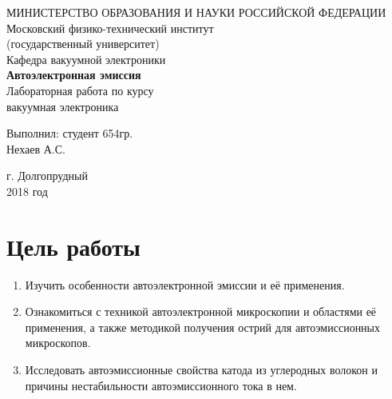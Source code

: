 \documentclass[a4paper, 12pt]{article}
\begin{document}
	\begin{titlepage}
		\begin{center}
		МИНИСТЕРСТВО ОБРАЗОВАНИЯ И НАУКИ РОССИЙСКОЙ ФЕДЕРАЦИИ\\
		\footnotesize{Московский физико-технический институт}\\
		\footnotesize{(государственный университет)}\\
		\footnotesize{Кафедра вакуумной электроники}\\
		\vfill
		{\LARGE
		\textbf{Автоэлектронная эмиссия}\\
		}
		\vspace{1cm}
		Лабораторная работа по курсу\\
		вакуумная электроника
		\vfill
		\begin{flushright}
			Выполнил: студент 654гр.\\
			Нехаев А.С.
		\end{flushright}
		\vfill
		г. Долгопрудный\\
		2018 год
		\end{center}
	\end{titlepage}
	\newpage
	\tableofcontents
	\newpage
	\section{Цель работы}
	\begin{enumerate}
		\item Изучить особенности автоэлектронной эмиссии и её применения.
		\item Ознакомиться с техникой автоэлектронной микроскопии и областями её применения, а также методикой получения острий для автоэмиссионных микроскопов.
		\item Исследовать автоэмиссионные свойства катода из углеродных волокон и причины нестабильности автоэмиссионного тока в нем.
	\end{enumerate}
	\newpage
\end{document}
